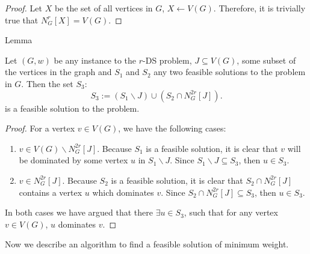 \begin{proof}
    Let $X$ be the set of all vertices in $G$, $X \leftarrow V(G)$. Therefore, it is 
    trivially true that $N^r_G[X] = V(G)$. 
\end{proof}

\begin{mydefinition}{Lemma}
    \label{lemma-r-DS-stitchable}

    Let $(G, w)$ be any instance to the $r$-DS problem, $J \subseteq V(G)$, some subset
    of the vertices in the graph 
    and $S_1$ and $S_2$ any two feasible solutions to the problem in $G$. Then the set $S_3$:
    \[S_3 := (S_1 \backslash J) \cup (S_2 \cap N^{2r}_{G} \left[J\right]).\]
    is a feasible solution to the problem.

\end{mydefinition}

\begin{proof}
    For a vertex $v \in V(G)$, we have the following cases:

    \begin{enumerate}
        \item $v \in V(G) \backslash N^{2r}_{G}[J]$. Because $S_1$ is a feasible solution,
        it is clear that $v$ will be dominated by some vertex $u$ in $S_1 \backslash J$. Since 
        $S_1 \backslash J \subseteq S_3$, then $u \in S_3$.
        \item $v \in N^{2r}_{G}[J]$. Because $S_2$ is a feasible solution, it is clear 
        that $S_2 \cap N^{2r}_{G}[J]$ contains a vertex $u$ which dominates $v$. Since 
        $S_2 \cap N^{2r}_{G}[J] \subseteq S_3$, then $u \in S_3$.
    \end{enumerate}

    In both cases we have argued that there $\exists u \in S_3$, such that for any vertex 
    $v \in V(G)$, $u$ dominates $v$.

\end{proof}

Now we describe an algorithm to find a feasible solution of minimum weight.

